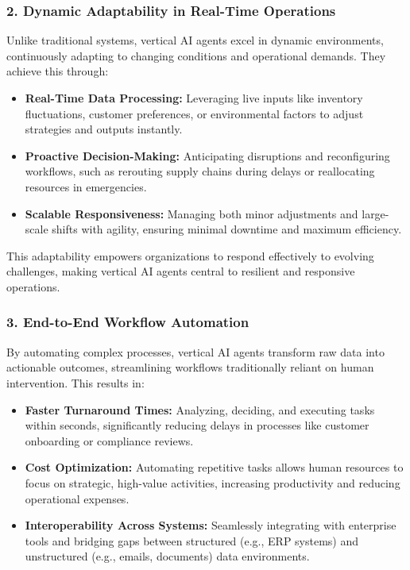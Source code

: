 \documentclass[12pt]{article}
\begin{document}
\subsubsection{2. Dynamic Adaptability in Real-Time Operations}
Unlike traditional systems, vertical AI agents excel in dynamic environments, continuously adapting to changing conditions and operational demands. They achieve this through:
\begin{itemize}
    \item \textbf{Real-Time Data Processing:} Leveraging live inputs like inventory fluctuations, customer preferences, or environmental factors to adjust strategies and outputs instantly.
    \item \textbf{Proactive Decision-Making:} Anticipating disruptions and reconfiguring workflows, such as rerouting supply chains during delays or reallocating resources in emergencies.
    \item \textbf{Scalable Responsiveness:} Managing both minor adjustments and large-scale shifts with agility, ensuring minimal downtime and maximum efficiency.
\end{itemize}
This adaptability empowers organizations to respond effectively to evolving challenges, making vertical AI agents central to resilient and responsive operations.

\subsubsection{3. End-to-End Workflow Automation}
By automating complex processes, vertical AI agents transform raw data into actionable outcomes, streamlining workflows traditionally reliant on human intervention. This results in:
\begin{itemize}
    \item \textbf{Faster Turnaround Times:} Analyzing, deciding, and executing tasks within seconds, significantly reducing delays in processes like customer onboarding or compliance reviews.
    \item \textbf{Cost Optimization:} Automating repetitive tasks allows human resources to focus on strategic, high-value activities, increasing productivity and reducing operational expenses.
    \item \textbf{Interoperability Across Systems:} Seamlessly integrating with enterprise tools and bridging gaps between structured (e.g., ERP systems) and unstructured (e.g., emails, documents) data environments.
\end{itemize}
\end{document}
